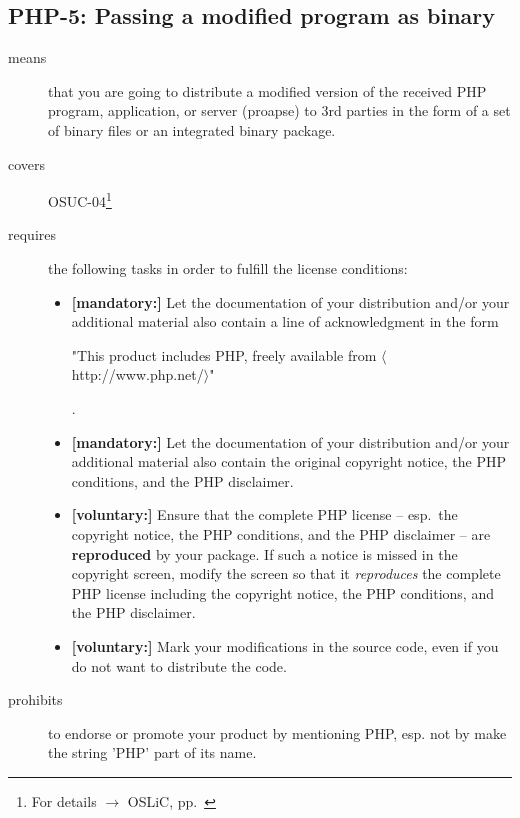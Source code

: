 \subsection{PHP-5: Passing a modified program as binary}

\begin{description}
\item[means] that you are going to distribute a modified version of the received
PHP pro\-gram, application, or server (proapse) to 3rd parties in the form of a set
of binary files or an integrated binary package.
\item[covers] OSUC-04\footnote{For details $\rightarrow$ OSLiC, pp.\ \pageref{OSUC-04-DEF}}
\item[requires] the following tasks in order to fulfill the license conditions:
\begin{itemize}
  
  \item \textbf{[mandatory:]} Let the documentation of your distribution and/or
  your additional material also contain a line of acknowledgment in the form
  \begin{footnotesize}"This product includes PHP, freely available from
  $\langle$http://www.php.net/$\rangle$"\end{footnotesize}.
    
  \item \textbf{[mandatory:]} Let the documentation of your distribution and/or
  your additional material also contain the original copyright notice, the PHP
  conditions, and the PHP disclaimer.

  \item \textbf{[voluntary:]} Ensure that the complete PHP license -- esp.\ the
  copyright notice, the PHP conditions, and the PHP disclaimer -- are
  \textbf{reproduced} by your package. If such a notice is missed in the
  copyright screen, modify the screen so  that it \emph{reproduces} the complete
  PHP license including the copyright notice, the PHP conditions, and the PHP
  disclaimer.
  
  \item \textbf{[voluntary:]} Mark your modifications in the source code,
  even if you do not want to distribute the code.

\end{itemize}

\item[prohibits] to endorse or promote your product by mentioning PHP, esp. not
by make the string 'PHP' part of its name.

\end{description}

